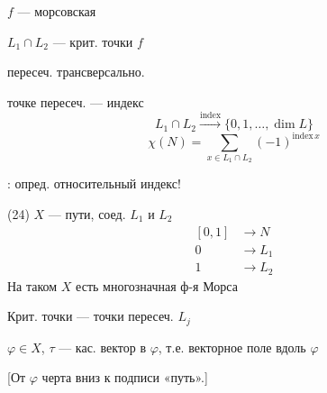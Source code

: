 \(f\) — морсовская

\(L_1\cap L_2\) — крит. точки \(f\)

пересеч. трансверсально.

точке пересеч. — индекс
\[
L_1\cap L_2\xrightarrow{\mathrm{index}}\{0,1,\ldots,\dim L\}
\]
\begin{equation*}
\chi(N)=\sum_{x\in L_1\cap L_2}(-1)^{\mathrm{index}\,x}
\tag{23}
\end{equation*}

: опред. относительный индекс!

(24) \(X\) — пути, соед. \(L_1\) и \(L_2\)
\[
\begin{aligned}
{}[0,1]&\longrightarrow N\\
0&\longrightarrow L_1\\
1&\longrightarrow L_2
\end{aligned}
\]
На таком \(X\) есть многозначная ф-я Морса

Крит. точки — точки пересеч. \(L_j\)

\(\varphi\in X\), \(\tau\) — кас. вектор в \(\varphi\), т.е. векторное поле вдоль \(\varphi\)

[От \(\varphi\) черта вниз к подписи «путь».]


